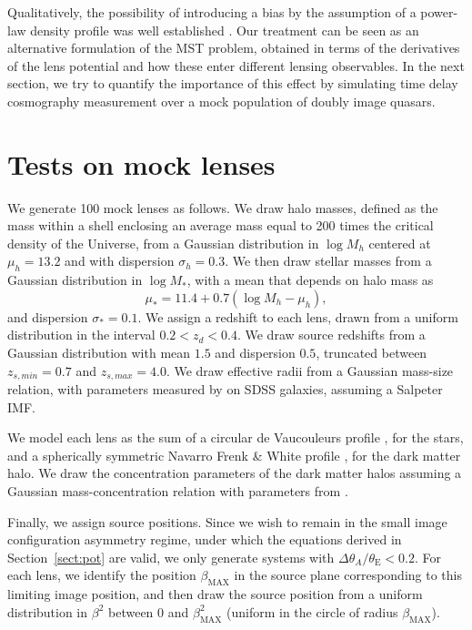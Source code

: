 \documentclass[usenatbib]{mnras}
\def\tein{\theta_{\mathrm{E}}}
\def\Sref#1{Section~\ref{#1}\xspace}
\begin{document}
Qualitatively, the possibility of introducing a bias by the assumption of a power-law density profile was well established \citep{S+S13}.
Our treatment can be seen as an alternative formulation of the MST problem, obtained in terms of the derivatives of the lens potential and how these enter different lensing observables.
In the next section, we try to quantify the importance of this effect by simulating time delay cosmography measurement over a mock population of doubly image quasars.

\section{Tests on mock lenses}

We generate 100 mock lenses as follows. We draw halo masses, defined as the mass within a shell enclosing an average mass equal to 200 times the critical density of the Universe, from a Gaussian distribution in $\log{M_h}$ centered at $\mu_h=13.2$ and with dispersion $\sigma_h=0.3$. We then draw stellar masses from a Gaussian distribution in $\log{M_*}$, with a mean that depends on halo mass as
\begin{equation}
\mu_* = 11.4 + 0.7(\log{M_h} - \mu_h),
\end{equation}
and dispersion $\sigma_*=0.1$.
We assign a redshift to each lens, drawn from a uniform distribution in the interval $0.2 < z_d < 0.4$. We draw source redshifts from a Gaussian distribution with mean $1.5$ and dispersion $0.5$, truncated between $z_{s,min}=0.7$ and $z_{s,max}=4.0$.
We draw effective radii from a Gaussian mass-size relation, with parameters measured by \citet{New++12} on SDSS galaxies, assuming a Salpeter IMF.

We model each lens as the sum of a circular de Vaucouleurs profile \citep{deV48}, for the stars, and a spherically symmetric Navarro Frenk \& White profile \citep[NFW][]{NFW97}, for the dark matter halo.
We draw the concentration parameters of the dark matter halos assuming a Gaussian mass-concentration relation with parameters from \citet{Mac++08}.

Finally, we assign source positions.
Since we wish to remain in the small image configuration asymmetry regime, under which the equations derived in \Sref{sect:pot} are valid, we only generate systems with $\Delta\theta_A/\tein < 0.2$. For each lens, we identify the position $\beta_{\mathrm{MAX}}$ in the source plane corresponding to this limiting image position, and then draw the source position from a uniform distribution in $\beta^2$ between 0 and $\beta_{\mathrm{MAX}}^2$ (uniform in the circle of radius $\beta_{\mathrm{MAX}}$).
\end{document}
